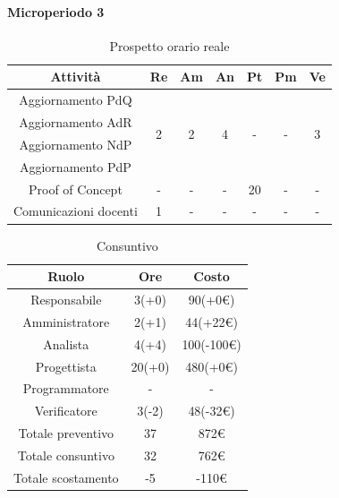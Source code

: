 \paragraph{Microperiodo 3}
\begin{table}[H]
	\centering
	\begin{tabular}{|c|c|c|c|c|c|c|}
		\hline
		\rowcolor{lighter-grayer}
		\textbf{Attività}     & \textbf{Re}        & \textbf{Am}        & \textbf{An}        & \textbf{Pt}        & \textbf{Pm}        & \textbf{Ve}        \\ \hline
		Aggiornamento PdQ     & \multirow{4}{*}{2} & \multirow{4}{*}{2} & \multirow{4}{*}{4} & \multirow{4}{*}{-} & \multirow{4}{*}{-} & \multirow{4}{*}{3} \\ \cline{1-1}
		Aggiornamento AdR     &                    &                    &                    &                    &                    &                    \\ \cline{1-1}
		Aggiornamento NdP     &                    &                    &                    &                    &                    &                    \\ \cline{1-1}
		Aggiornamento PdP     &                    &                    &                    &                    &                    &                    \\ \hline
		Proof of Concept                   & -                  & -                  & -                  & 20                 & -                  & -                  \\ \hline
		Comunicazioni docenti & 1                  & -                  & -                  & -                  & -                  & -                  \\ \hline
	\end{tabular}
\caption{ Prospetto orario reale\\}
\end{table}

\begin{table}[H]
	\centering
	\renewcommand{\arraystretch}{1.5}
	\begin{tabular}{|c|c|c|}
		\hline
		\rowcolor{lighter-grayer}
		Ruolo & Ore & Costo \\ \hline
		Responsabile & 3(+0) & 90(+0\euro) \\ \hline
		Amministratore & 2(+1) & 44(+22\euro) \\ \hline
		Analista & 4(+4) & 100(-100\euro) \\ \hline
		Progettista & 20(+0) & 480(+0\euro) \\ \hline
		Programmatore & - & - \\ \hline
		Verificatore & 3(-2) & 48(-32\euro) \\ \hline
		Totale preventivo & 37 & 872\euro \\ \hline
		Totale consuntivo & 32 & 762\euro \\ \hline
		Totale scostamento & -5 & -110\euro \\ \hline
	\end{tabular}
	\caption{ Consuntivo\\}
\end{table}

